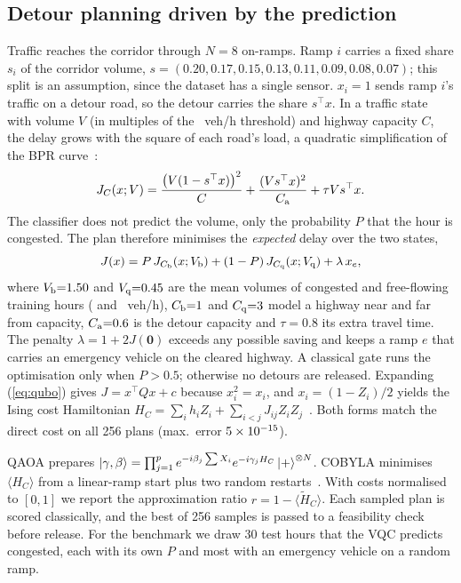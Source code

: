 \documentclass[conference]{IEEEtran}
\begin{document}
\subsection{Detour planning driven by the prediction}
\label{sec:qubo}
Traffic reaches the corridor through $N{=}8$ on-ramps. Ramp $i$ carries a fixed share $s_i$ of the corridor volume, $s=(0.20,0.17,0.15,0.13,0.11,0.09,0.08,0.07)$; this split is an assumption, since the dataset has a single sensor. $x_i{=}1$ sends ramp $i$'s traffic on a detour road, so the detour carries the share $s^\top x$. In a traffic state with volume $V$ (in multiples of the \Thr{}~veh/h threshold) and highway capacity $C$, the delay grows with the square of each road's load, a quadratic simplification of the BPR curve~\cite{bpr1964}:
\begin{equation}
J_C(x;V)=\frac{\big(V(1-s^\top x)\big)^2}{C}+\frac{(V s^\top x)^2}{C_{\rm a}}+\tau V s^\top x .
\end{equation}
The classifier does not predict the volume, only the probability $P$ that the hour is congested. The plan therefore minimises the \emph{expected} delay over the two states,
\begin{equation}
J(x)=P\,J_{C_{\rm b}}(x;V_{\rm b})+(1-P)\,J_{C_{\rm q}}(x;V_{\rm q})+\lambda\,x_e ,
\label{eq:qubo}
\end{equation}
where $V_{\rm b}{=}1.50$ and $V_{\rm q}{=}0.45$ are the mean volumes of congested and free-flowing training hours (\vBusy{} and \vQuiet{}~veh/h), $C_{\rm b}{=}1$ and $C_{\rm q}{=}3$ model a highway near and far from capacity, $C_{\rm a}{=}0.6$ is the detour capacity and $\tau{=}0.8$ its extra travel time. The penalty $\lambda=1+2J(\mathbf 0)$ exceeds any possible saving and keeps a ramp $e$ that carries an emergency vehicle on the cleared highway. A classical gate runs the optimisation only when $P>0.5$; otherwise no detours are released. Expanding (\ref{eq:qubo}) gives $J=x^\top Qx+c$ because $x_i^2=x_i$, and $x_i=(1-Z_i)/2$ yields the Ising cost Hamiltonian $H_C=\sum_i h_iZ_i+\sum_{i<j}J_{ij}Z_iZ_j$~\cite{lucas2014ising}. Both forms match the direct cost on all 256 plans (max.\ error $5\times10^{-15}$).

QAOA prepares $\ket{\gamma,\beta}=\prod_{j=1}^{p}e^{-i\beta_j\sum X_i}e^{-i\gamma_j H_C}\ket{+}^{\otimes N}$. COBYLA minimises $\langle H_C\rangle$ from a linear-ramp start plus two random restarts~\cite{zhou2020qaoa}. With costs normalised to $[0,1]$ we report the approximation ratio $r=1-\langle \tilde H_C\rangle$. Each sampled plan is scored classically, and the best of 256 samples is passed to a feasibility check before release. For the benchmark we draw 30 test hours that the VQC predicts congested, each with its own $P$ and most with an emergency vehicle on a random ramp.
\end{document}
